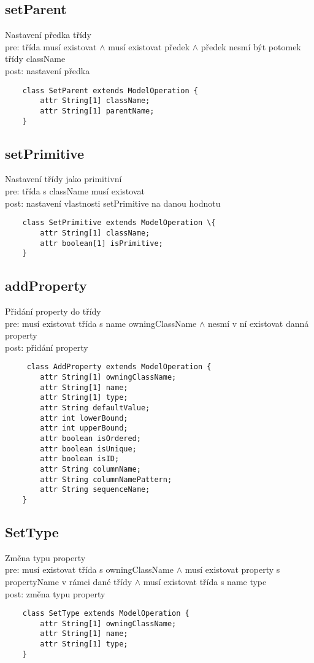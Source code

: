\documentclass[11pt,a4paper]{article}
\begin{document}
	\subsection{setParent}
	Nastavení předka třídy \\
	pre: třída musí existovat $\wedge$ musí existovat předek $\wedge$ předek
	nesmí být potomek třídy className\\
	post: nastavení předka \\
		
	\begin{verbatim}
    class SetParent extends ModelOperation {
        attr String[1] className;
        attr String[1] parentName;
    }
    \end{verbatim}
	
	\subsection{setPrimitive}
	Nastavení třídy jako primitivní \\
	pre: třída s className musí existovat \\
	post: nastavení vlastnosti setPrimitive na danou hodnotu\\
	\begin{verbatim}
    class SetPrimitive extends ModelOperation \{
        attr String[1] className;
        attr boolean[1] isPrimitive;
    }
    \end{verbatim}
	
	\subsection{addProperty}
	Přidání property do třídy \\
	pre: musí existovat třída s name owningClassName $\wedge$ nesmí v ní
	existovat danná property \\ post: přidání property \\
	\begin{verbatim}
     class AddProperty extends ModelOperation {
        attr String[1] owningClassName;
        attr String[1] name;
        attr String[1] type;
        attr String defaultValue;
        attr int lowerBound;
        attr int upperBound;
        attr boolean isOrdered;
        attr boolean isUnique;
        attr boolean isID;
        attr String columnName;
        attr String columnNamePattern;
        attr String sequenceName;
    }
    \end{verbatim}

	\subsection{SetType}
	Změna typu property \\
	pre: musí existovat třída s owningClassName $\wedge$ musí existovat
	property s propertyName v rámci dané třídy $\wedge$ musí existovat třída s name
	type 
	\\ post: změna typu property \\
	\begin{verbatim}
    class SetType extends ModelOperation {
        attr String[1] owningClassName;
        attr String[1] name;
        attr String[1] type;
    }
	\end{verbatim}
	
\end{document}
